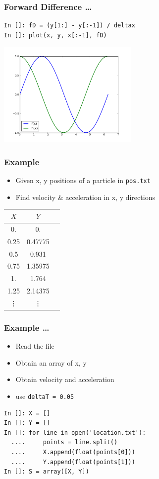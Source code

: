 \documentclass[14pt,compress]{beamer}
\newcommand{\typ}[1]{\lstinline{#1}}
\begin{document}
\begin{frame}[fragile]
\frametitle{Forward Difference \ldots}
\begin{lstlisting}
In []: fD = (y[1:] - y[:-1]) / deltax
In []: plot(x, y, x[:-1], fD)
\end{lstlisting}
\begin{center}
  \includegraphics[height=2in, interpolate=true]{data/fwdDiff}
\end{center}
\end{frame}

\begin{frame}[fragile]
\frametitle{Example}
\begin{itemize}
\item Given x, y positions of a particle in \typ{pos.txt}
\item Find velocity \& acceleration in x, y directions
\end{itemize}
\small{
\begin{center}
\begin{tabular}{| c | c | c |}
\hline
$X$ & $Y$ \\ \hline
0.     &  0.\\ \hline
0.25   &  0.47775\\ \hline
0.5    &  0.931\\ \hline
0.75   &  1.35975\\ \hline
1.     &  1.764\\ \hline
1.25   &  2.14375\\ \hline
\vdots & \vdots\\ \hline
\end{tabular}
\end{center}}
\end{frame}

\begin{frame}[fragile]
\frametitle{Example \ldots}
\begin{itemize}
\item Read the file
\item Obtain an array of x, y
\item Obtain velocity and acceleration
\item use \typ{deltaT = 0.05}
\end{itemize}
\begin{lstlisting}
In []: X = []
In []: Y = []
In []: for line in open('location.txt'):
  ....     points = line.split()
  ....     X.append(float(points[0]))
  ....     Y.append(float(points[1]))
In []: S = array([X, Y])
\end{lstlisting}
\end{frame}
\end{document}
